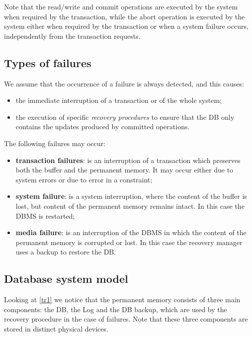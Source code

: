 Note that the read/write and commit operations are executed by the system when required by the transaction, while the abort operation is executed by the system either when required by the transaction or when a system failure occurs, independently from the transaction requests.

\subsection{Types of failures}
We assume that the occurrence of a failure is always detected, and this causes:

\begin{itemize}
    \item the immediate interruption of a transaction or of the whole system;
    \item the execution of specific \textit{recovery procedures} to ensure that the DB only contains the updates produced by committed operations.
\end{itemize}

The following failures may occur:

\begin{itemize}

    \item \textbf{transaction failures}: is an interruption of a transaction which preserves both the buffer and the permanent memory. It may occur either due to system errors or due to error in a constraint;
    
    \item \textbf{system failure}: is a system interruption, where the content of the buffer is lost, but content of the permanent memory remains intact. In this case the DBMS is restarted;
    
    \item \textbf{media failure}: is an interruption of the DBMS in which the content of the permanent memory is corrupted or lost. In this case the recovery manager uses a backup to restore the DB.
    
\end{itemize}

\subsection{Database system model}
Looking at \ref{tr1} we notice that the permanent memory consists of three main components: the DB, the Log and the DB backup, which are used by the recovery procedure in the case of failures. Note that these three components are stored in distinct physical devices.

